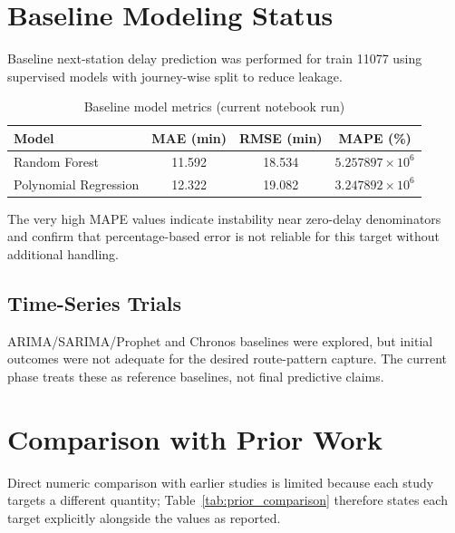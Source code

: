 \documentclass[12pt,a4paper]{report}
\begin{document}
\section{Baseline Modeling Status}
Baseline next-station delay prediction was performed for train 11077 using supervised models with journey-wise split to reduce leakage.

\begin{table}[H]
\centering
\caption{Baseline model metrics (current notebook run)}
\label{tab:model_metrics}
\begin{tabular}{lccc}
\toprule
Model & MAE (min) & RMSE (min) & MAPE (\%) \\
\midrule
Random Forest & 11.592 & 18.534 & $5.257897\times10^6$ \\
Polynomial Regression & 12.322 & 19.082 & $3.247892\times10^6$ \\
\bottomrule
\end{tabular}
\end{table}

\noindent The very high MAPE values indicate instability near zero-delay denominators and confirm that percentage-based error is not reliable for this target without additional handling.

\subsection{Time-Series Trials}
ARIMA/SARIMA/Prophet and Chronos baselines were explored, but initial outcomes were not adequate for the desired route-pattern capture. The current phase treats these as reference baselines, not final predictive claims.

\section{Comparison with Prior Work}
Direct numeric comparison with earlier studies is limited because each study targets a different quantity; Table~\ref{tab:prior_comparison} therefore states each target explicitly alongside the values as reported.
\end{document}
